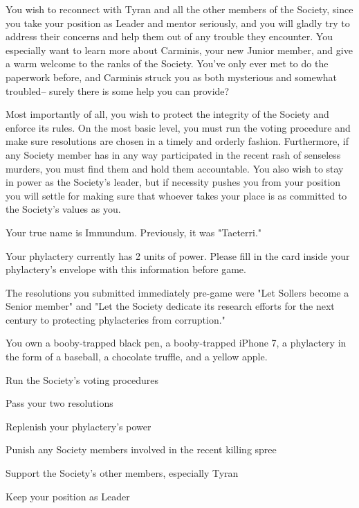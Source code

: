 \documentclass[char]{Sel}
\begin{document}
You wish to reconnect with Tyran and all the other members of the Society, since you take your position as Leader and mentor seriously, and you will gladly try to address their concerns and help them out of any trouble they encounter. You especially want to learn more about Carminis, your new Junior member, and give a warm welcome to the ranks of the Society. You’ve only ever met to do the paperwork before, and Carminis struck you as both mysterious and somewhat troubled-- surely there is some help you can provide?

Most importantly of all, you wish to protect the integrity of the Society and enforce its rules. On the most basic level, you must run the voting procedure and make sure resolutions are chosen in a timely and orderly fashion. Furthermore, if any Society member has in any way participated in the recent rash of senseless murders, you must find them and hold them accountable. You also wish to stay in power as the Society's leader, but if necessity pushes you from your position you will settle for making sure that whoever takes your place is as committed to the Society's values as you.
\begin{itemz}[Notes]
  \item Your true name is Immundum. Previously, it was "Taeterri."
    \item Your phylactery currently has 2 units of power. Please fill in the card inside your phylactery's envelope with this information before game.
  \item The resolutions you submitted immediately pre-game were "Let Sollers become a Senior member" and "Let the Society dedicate its research efforts for the next century to protecting phylacteries from corruption."
  \item You own a booby-trapped black pen, a booby-trapped iPhone 7, a phylactery in the form of a baseball, a chocolate truffle, and a yellow apple.
    \end{itemz}
    

     \begin{itemz}[Goals]
     \item Run the Society's voting procedures
 \item Pass your two resolutions
 \item Replenish your phylactery's power
\item Punish any Society members involved in the recent killing spree
\item Support the Society's other members, especially Tyran
\item Keep your position as Leader
\end{itemz}
\end{document}
